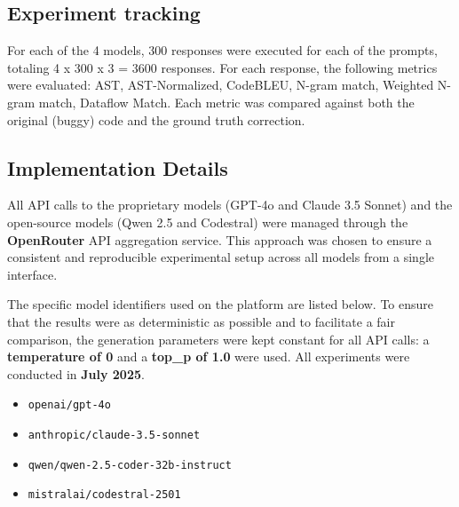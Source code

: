 \subsection{Experiment tracking}
For each of the 4 models, 300 responses were executed for each of the prompts, totaling 4 x 300 x 3 = 3600 responses. For each response, the following metrics were evaluated: AST, AST-Normalized, CodeBLEU, N-gram match, Weighted N-gram match, Dataflow Match.
Each metric was compared against both the original (buggy) code and the ground truth correction.


\subsection{Implementation Details}
\label{sec:implementation-details}

All API calls to the proprietary models (GPT-4o and Claude 3.5 Sonnet) and the open-source models (Qwen 2.5 and Codestral) were managed through the \textbf{OpenRouter} API aggregation service. This approach was chosen to ensure a consistent and reproducible experimental setup across all models from a single interface.

The specific model identifiers used on the platform are listed below. To ensure that the results were as deterministic as possible and to facilitate a fair comparison, the generation parameters were kept constant for all API calls: a \textbf{temperature of 0} and a \textbf{top\_p of 1.0} were used. All experiments were conducted in \textbf{July 2025}.

\begin{itemize}
    \item \texttt{openai/gpt-4o}
    \item \texttt{anthropic/claude-3.5-sonnet}
    \item \texttt{qwen/qwen-2.5-coder-32b-instruct} 
    \item \texttt{mistralai/codestral-2501}
\end{itemize}



